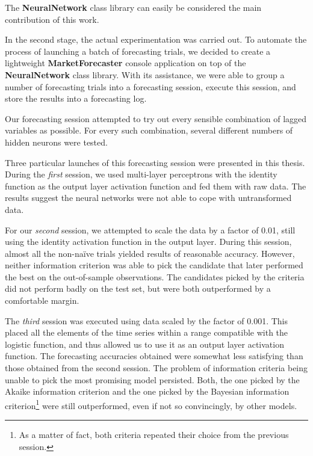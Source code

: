 The \textbf{NeuralNetwork} class library can easily be considered the main contribution of this work.

\medskip

In the second stage, the actual experimentation was carried out. To automate the process of launching a batch of forecasting trials, we decided to create a lightweight \textbf{MarketForecaster} console application on top of the \textbf{NeuralNetwork} class library. With its assistance, we were able to group a number of forecasting trials into a forecasting session, execute this session, and store the results into a forecasting log.

Our forecasting session attempted to try out every sensible combination of lagged variables as possible. For every such combination, several different numbers of hidden neurons were tested.

Three particular launches of this forecasting session were presented in this thesis. During the \textit{first} session, we used multi-layer perceptrons with the identity function as the output layer activation function and fed them with raw data. The results suggest the neural networks were not able to cope with untransformed data.

For our \textit{second} session, we attempted to scale the data by a factor of 0.01, still using the identity activation function in the output layer. During this session, almost all the non-na\"{i}ve trials yielded results of reasonable accuracy. However, neither information criterion was able to pick the candidate that later performed the best on the out-of-sample observations. The candidates picked by the criteria did not perform badly on the test set, but were both outperformed by a comfortable margin.

The \textit{third} session was executed using data scaled by the factor of 0.001. This placed all the elements of the time series within a range compatible with the logistic function, and thus allowed us to use it as an output layer activation function. The forecasting accuracies obtained were somewhat less satisfying than those obtained from the second session. The problem of information criteria being unable to pick the most promising model persisted. Both, the one picked by the Akaike information criterion and the one picked by the Bayesian information criterion\footnote{As a matter of fact, both criteria repeated their choice from the previous session.} were still outperformed, even if not so convincingly, by other models.